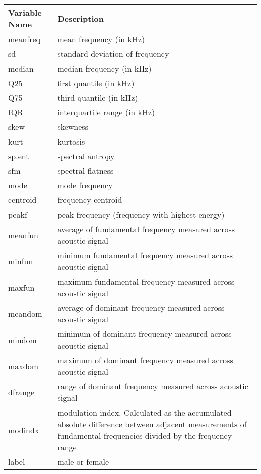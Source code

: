 \begin{center}
\begin{tabular}{ m{5em} | m{10cm}}
\toprule
Variable Name & Description
\tabularnewline
\midrule
meanfreq & mean frequency (in kHz)
\tabularnewline
sd & standard deviation of frequency
\tabularnewline
median & median frequency (in kHz)
\tabularnewline
Q25 & first quantile (in kHz)
\tabularnewline
Q75 & third quantile (in kHz)
\tabularnewline
IQR & interquartile range (in kHz)
\tabularnewline
skew & skewness
\tabularnewline
kurt & kurtosis
\tabularnewline
sp.ent & spectral antropy
\tabularnewline
sfm & spectral flatness
\tabularnewline
mode & mode frequency
\tabularnewline
centroid & frequency centroid
\tabularnewline
peakf & peak frequency (frequency with highest energy)
\tabularnewline
meanfun & average of fundamental frequency measured across acoustic signal
\tabularnewline
minfun & minimum fundamental frequency measured across acoustic signal
\tabularnewline
maxfun & maximum fundamental frequency measured across acoustic signal 
\tabularnewline
meandom & average of dominant frequency measured across acoustic signal 
\tabularnewline
mindom & minimum of dominant frequency measured across acoustic signal 
\tabularnewline
maxdom & maximum of dominant frequency measured across acoustic signal 
\tabularnewline
dfrange & range of dominant frequency measured across acoustic signal 
\tabularnewline
modindx & modulation index. Calculated as the accumulated absolute difference between adjacent measurements of fundamental frequencies divided by the frequency range 
\tabularnewline
label & male or female
\tabularnewline

\bottomrule
\end{tabular}
\end{center}




